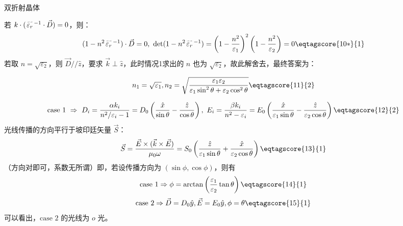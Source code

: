 \documentclass[answer]{cphos}
\begin{document}
\begin{problem}[50]{双折射晶体}
\begin{solution}
\begin{multisol}[解法]
若 $k\cdot({}\!\stackrel{\text{\fontsize{3}{1}$\rightarrow\rightarrow$}}{\varepsilon_r}\!{}^{-1}\cdot\vec D)=0$，则：
\begin{equation}
    (1-n^2{}\!\stackrel{\text{\fontsize{3}{1}$\rightarrow\rightarrow$}}{\varepsilon_r}\!{}^{-1})\cdot\vec D=0,\ \det(1-n^2{}\!\stackrel{\text{\fontsize{3}{1}$\rightarrow\rightarrow$}}{\varepsilon_r}\!{}^{-1})=\left( 1-\frac{n^2}{\varepsilon_1} \right)^2\left( 1-\frac{n^2}{\varepsilon_2} \right)=0\eqtagscore{10*}{1}
\end{equation}
若取 $n=\sqrt{\varepsilon_2}$，则 $\vec D//\hat z$，要求 $\vec k\perp\hat z$，此时情况1求出的 $n$ 也为 $\sqrt{\varepsilon_2}$，故此解舍去，最终答案为：

\end{multisol}
\begin{equation}
    n_1=\sqrt{\varepsilon_1},n_2=\sqrt{\dfrac{\varepsilon_1\varepsilon_2}{\varepsilon_1\sin^2\theta+\varepsilon_2\cos^2\theta}}\eqtagscore{11}{2}\label{eq:11}
\end{equation}

\begin{equation}
    \text{case 1}\ \Rightarrow\ D_i=\dfrac{\alpha k_i}{n^2/\varepsilon_i-1}=D_0\left( \dfrac{\hat x}{\sin\theta}-\dfrac{\hat z}{\cos\theta} \right),\ E_i=\dfrac{\beta k_i}{n^2-\varepsilon_i}=E_0\left( \dfrac{\hat x}{\varepsilon_1\sin\theta}-\dfrac{\hat z}{\varepsilon_2\cos\theta} \right)\eqtagscore{12}{2}
\end{equation}
光线传播的方向平行于坡印廷矢量 $\vec S$：
\begin{equation}
    \vec S=\dfrac{\vec E\times(\vec k\times\vec E)}{\mu_0\omega}=S_0\left( \dfrac{\hat z}{\varepsilon_1\sin\theta}+\dfrac{\hat x}{\varepsilon_2\cos\theta} \right)\eqtagscore{13}{1}
\end{equation}
（方向对即可，系数无所谓）即，若设传播方向为 $(\sin\phi,\cos\phi)$，则有
\begin{equation}
    \text{case 1}\Rightarrow\phi=\arctan\left(\dfrac{\varepsilon_1}{\varepsilon_2}\tan\theta\right)\eqtagscore{14}{1}
\end{equation}
\begin{equation}
    \text{case 2}\Rightarrow\vec D=D_0\hat y,\vec E=E_0\hat y,\phi=\theta\eqtagscore{15}{1}
\end{equation}
可以看出，$\text{case 2}$ 的光线为 $o$ 光。


\end{solution}
\end{problem}
\end{document}
